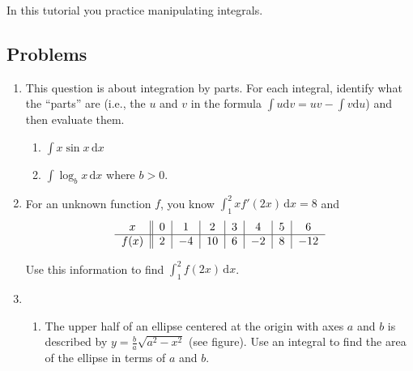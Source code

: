 	\begin{objectives}
        In this tutorial you practice manipulating integrals.
	\end{objectives}

		\vspace{-.5em}
		\subsection*{Problems}
		\vspace{-.5em}


\begin{enumerate}
    \item This question is about integration by parts. For each integral, identify what the ``parts'' are (i.e., the $u$ and $v$ in the formula
    $\displaystyle \int u\mathrm dv = uv-\int v\mathrm d u$) and then evaluate them.
    \begin{enumerate}
        \item $\displaystyle \int x\sin x\,\mathrm d x$
        \item $\displaystyle\int\log_b x\,\mathrm d x$ where $b>0$.
    \end{enumerate}
    \item 
    For an unknown function $f$, you know $\displaystyle\int_1^2 xf'(2x)\,\mathrm d x=8$ and 
    	\begin{align*}
    	    \hfill\begin{tabular}{c||c|c|c|c|c|c|c}
            $x$&$0$&$1$&$2$&$3$&$4$&$5$&$6$\\
            \hline
            $f(x)$&$2$&$-4$&$10$&$6$&$-2$&$8$&$-12$
            \end{tabular}\hfill\null
    	\end{align*}

        Use this information to find $\displaystyle\int_1^2 f(2x)\,\mathrm d x$.

    \item \phantom{x}
    \begin{enumerate}

        \item \phantom{x}
        
        \begin{minipage}{0.5\textwidth}
        The upper half of an ellipse centered at the origin with axes $a$ and $b$ is described by $y = \frac{b}{a}\sqrt{a^2-x^2}$ (see figure). Use an integral to find the area of the ellipse in terms of $a$ and $b$.


\end{minipage}
\end{enumerate}
\end{enumerate}
